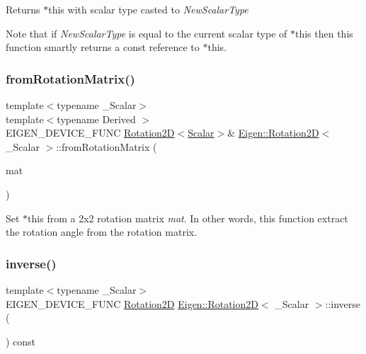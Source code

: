 \begin{DoxyReturn}{Returns}
{\ttfamily $\ast$this} with scalar type casted to {\itshape New\+Scalar\+Type} 
\end{DoxyReturn}
Note that if {\itshape New\+Scalar\+Type} is equal to the current scalar type of {\ttfamily $\ast$this} then this function smartly returns a const reference to {\ttfamily $\ast$this}. \mbox{\label{class_eigen_1_1_rotation2_d_ab60bf3b2d7a33e8e29856f35839eba72}} 
\subsubsection{\texorpdfstring{fromRotationMatrix()}{fromRotationMatrix()}}
{\footnotesize\ttfamily template$<$typename \+\_\+\+Scalar$>$ \\
template$<$typename Derived $>$ \\
E\+I\+G\+E\+N\+\_\+\+D\+E\+V\+I\+C\+E\+\_\+\+F\+U\+NC \mbox{\hyperlink{class_eigen_1_1_rotation2_d}{Rotation2D}}$<$\mbox{\hyperlink{class_eigen_1_1_rotation2_d_ac20c665ece0f197a712a2a39ae72e4e4}{Scalar}}$>$\& \mbox{\hyperlink{class_eigen_1_1_rotation2_d}{Eigen\+::\+Rotation2D}}$<$ \+\_\+\+Scalar $>$\+::from\+Rotation\+Matrix (\begin{DoxyParamCaption}\item[{const \mbox{\hyperlink{class_eigen_1_1_matrix_base}{Matrix\+Base}}$<$ Derived $>$ \&}]{mat }\end{DoxyParamCaption})}

Set {\ttfamily $\ast$this} from a 2x2 rotation matrix {\itshape mat}. In other words, this function extract the rotation angle from the rotation matrix. \mbox{\label{class_eigen_1_1_rotation2_d_a31e2adeabbde2a5210237f903fc40600}} 
\subsubsection{\texorpdfstring{inverse()}{inverse()}}
{\footnotesize\ttfamily template$<$typename \+\_\+\+Scalar$>$ \\
E\+I\+G\+E\+N\+\_\+\+D\+E\+V\+I\+C\+E\+\_\+\+F\+U\+NC \mbox{\hyperlink{class_eigen_1_1_rotation2_d}{Rotation2D}} \mbox{\hyperlink{class_eigen_1_1_rotation2_d}{Eigen\+::\+Rotation2D}}$<$ \+\_\+\+Scalar $>$\+::inverse (\begin{DoxyParamCaption}{ }\end{DoxyParamCaption}) const\hspace{0.3cm}{\ttfamily [inline]}}

